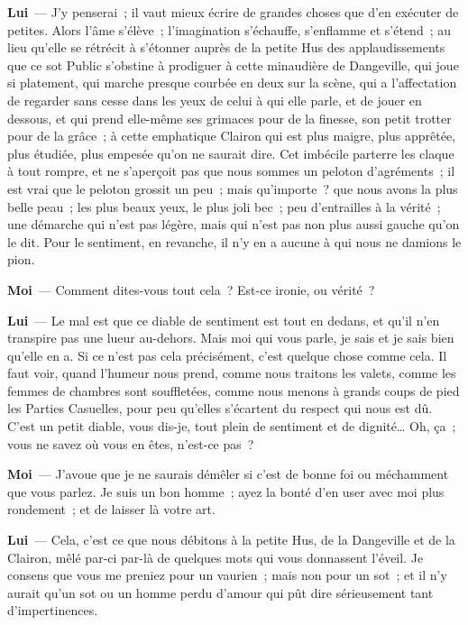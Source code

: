 \documentclass[french,twoside]{book} %
\newcommand{\labelchar}[1]{\textbf{\color{rubric} #1}}
\begin{document}
\labelchar{Lui} — J’y penserai ; il vaut mieux écrire de grandes choses que d’en exécuter de petites. Alors l’âme s’élève ; l’imagination s’échauffe, s’enflamme et s’étend ; au lieu qu’elle se rétrécit à s’étonner auprès de la petite Hus des applaudissements que ce sot Public s’obstine à prodiguer à cette minaudière de Dangeville, qui joue si platement, qui marche presque courbée en deux sur la scène, qui a l’affectation de regarder sans cesse dans les yeux de celui à qui elle parle, et de jouer en dessous, et qui prend elle-même ses grimaces pour de la finesse, son petit trotter pour de la grâce ; à cette emphatique Clairon qui est plus maigre, plus apprêtée, plus étudiée, plus empesée qu’on ne saurait dire. Cet imbécile parterre les claque à tout rompre, et ne s’aperçoit pas que nous sommes un peloton d’agréments ; il est vrai que le peloton grossit un peu ; mais qu’importe ? que nous avons la plus belle peau ; les plus beaux yeux, le plus joli bec ; peu d’entrailles à la vérité ; une démarche qui n’est pas légère, mais qui n’est pas non plus aussi gauche qu’on le dit. Pour le sentiment, en revanche, il n’y en a aucune à qui nous ne damions le pion.\par
\labelchar{Moi} — Comment dites-vous tout cela ? Est-ce ironie, ou vérité ?\par
\labelchar{Lui} — Le mal est que ce diable de sentiment est tout en dedans, et qu’il n’en transpire pas une lueur au-dehors. Mais moi qui vous parle, je sais et je sais bien qu’elle en a. Si ce n’est pas cela précisément, c’est quelque chose comme cela. Il faut voir, quand l’humeur nous prend, comme nous traitons les valets, comme les femmes de chambres sont souffletées, comme nous menons à grands coups de pied les Parties Casuelles, pour peu qu’elles s’écartent du respect qui nous est dû. C’est un petit diable, vous dis-je, tout plein de sentiment et de dignité… Oh, ça ; vous ne savez où vous en êtes, n’est-ce pas ?\par
\labelchar{Moi} — J’avoue que je ne saurais démêler si c’est de bonne foi ou méchamment que vous parlez. Je suis un bon homme ; ayez la bonté d’en user avec moi plus rondement ; et de laisser là votre art.\par
\labelchar{Lui} — Cela, c’est ce que nous débitons à la petite Hus, de la Dangeville et de la Clairon, mêlé par-ci par-là de quelques mots qui vous donnassent l’éveil. Je consens que vous me preniez pour un vaurien ; mais non pour un sot ; et il n’y aurait qu’un sot ou un homme perdu d’amour qui pût dire sérieusement tant d’impertinences.\par
\end{document}
